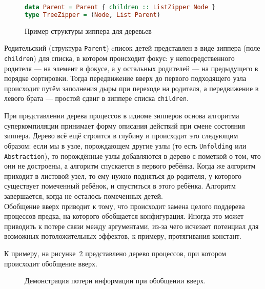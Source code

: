 \begin{figure}[h!]
\begin{lstlisting}[mathescape,language=Haskell,extendedchars=\true,frame=single,basicstyle=\ttfamily]
data Parent = Parent { children :: ListZipper Node }
type TreeZipper = (Node, List Parent)
\end{lstlisting}
\caption{Пример структуры зиппера для деревьев}
\label{fig:zipper}
\end{figure}

Родительский (структура \lstinline{Parent}) cписок детей представлен в виде зиппера (поле \lstinline{children})
для списка, в котором происходит фокус: у непосредственного родителя --- на элемент в фокусе, а у остальных
родителей --- на предыдущего в порядке сортировки.
Тогда передвижение вверх до первого подходящего узла происходит путём
заполнения дыры при переходе на родителя, а передвижение в левого брата ---
простой сдвиг в зиппере списка \lstinline{children}.

При представлении дерева процессов в идиоме зипперов основа алгоритма
суперкомпиляции принимает форму описания действий при смене состояния зиппера.
Дерево всё ещё строится в глубину и происходит это следующим образом:
если мы в узле, порождающем другие узлы (то есть \lstinline{Unfolding}
или \lstinline{Abstraction}), то порождённые узлы добавляются в дерево
с пометкой о том, что они не достроены, а алгоритм спускается в первого
ребёнка. Когда же алгоритм приходит в листовой узел, то ему нужно подняться
до родителя, у которого существует помеченный ребёнок, и спуститься в этого
ребёнка. Алгоритм завершается, когда не осталось помеченных детей. \\

Обобщение вверх приводит к тому, что происходит замена целого поддерева процессов
предка, на которого обобщается конфигурация. Иногда это может приводить к потере
связи между аргументами, из-за чего исчезает потенциал для возможных
потоложительных эффектов, к примеру, протягивания констант.

К примеру, на рисунке~\ref{fig:genup} представлено дерево процессов, при котором происходит обобщение вверх.

\begin{figure}[h!]
\center
{}
\caption{Демонстрация потери информации при обобщении вверх.}
\label{fig:genup}
\end{figure}

